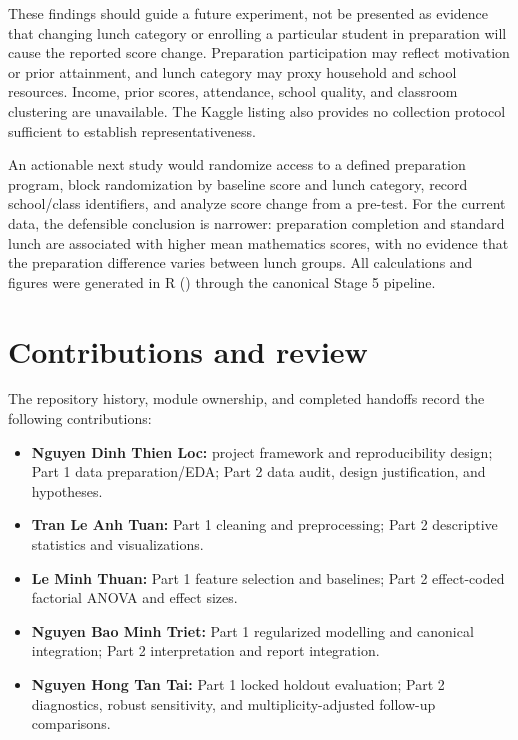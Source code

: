 \documentclass[
  10pt,
]{article}
\providecommand{\tightlist}{%
  \setlength{\itemsep}{0pt}\setlength{\parskip}{0pt}}
\begin{document}
These findings should guide a future experiment, not be presented as
evidence that changing lunch category or enrolling a particular student
in preparation will cause the reported score change. Preparation
participation may reflect motivation or prior attainment, and lunch
category may proxy household and school resources. Income, prior scores,
attendance, school quality, and classroom clustering are unavailable.
The Kaggle listing also provides no collection protocol sufficient to
establish representativeness.

An actionable next study would randomize access to a defined preparation
program, block randomization by baseline score and lunch category,
record school/class identifiers, and analyze score change from a
pre-test. For the current data, the defensible conclusion is narrower:
preparation completion and standard lunch are associated with higher
mean mathematics scores, with no evidence that the preparation
difference varies between lunch groups. All calculations and figures
were generated in R () through
the canonical Stage 5 pipeline.

\section{Contributions and review}\label{contributions-and-review}

The repository history, module ownership, and completed handoffs record
the following contributions:

\begin{itemize}
\tightlist
\item
  \textbf{Nguyen Dinh Thien Loc:} project framework and reproducibility
  design; Part 1 data preparation/EDA; Part 2 data audit, design
  justification, and hypotheses.
\item
  \textbf{Tran Le Anh Tuan:} Part 1 cleaning and preprocessing; Part 2
  descriptive statistics and visualizations.
\item
  \textbf{Le Minh Thuan:} Part 1 feature selection and baselines; Part 2
  effect-coded factorial ANOVA and effect sizes.
\item
  \textbf{Nguyen Bao Minh Triet:} Part 1 regularized modelling and
  canonical integration; Part 2 interpretation and report integration.
\item
  \textbf{Nguyen Hong Tan Tai:} Part 1 locked holdout evaluation; Part 2
  diagnostics, robust sensitivity, and multiplicity-adjusted follow-up
  comparisons.
\end{itemize}
\end{document}
